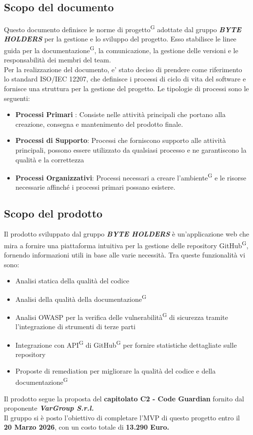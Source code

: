 \documentclass[a4paper, 11pt]{article}
\begin{document}
\subsection{Scopo del documento}
Questo documento definisce le norme di progetto\textsuperscript{G} adottate dal gruppo \textbf{\textit{BYTE HOLDERS}} per la gestione e lo sviluppo del progetto. Esso stabilisce le linee guida per la documentazione\textsuperscript{G}, la comunicazione, la gestione delle versioni e le responsabilità dei membri del team.
\\
Per la realizzazione del documento, e' stato deciso di prendere come riferimento lo standard ISO/IEC 12207, 
che definisce i processi di ciclo di vita del software e fornisce una struttura per la gestione del progetto.
Le tipologie di processi sono le seguenti:
\\
\begin{itemize}
    \item \textbf{Processi Primari} : Consiste nelle attività principali che portano alla creazione, consegna e mantenimento del prodotto finale.
    \item \textbf{Processi di Supporto}: Processi che forniscono supporto alle attività principali, possono essere utilizzato da qualsiasi processo e ne garantiscono la qualità e la correttezza
    \item \textbf{Processi Organizzativi}: Processi necessari a creare l'ambiente\textsuperscript{G} e le risorse necessarie affinché i processi primari possano esistere.
\end{itemize}


\subsection{Scopo del prodotto}
Il prodotto sviluppato dal gruppo \textbf{\textit{BYTE HOLDERS}} è un'applicazione web che mira a fornire una piattaforma intuitiva per la gestione delle repository GitHub\textsuperscript{G}, 
fornendo informazioni utili in base alle varie necessità.
Tra queste funzionalità vi sono:
\begin{itemize}
    \item Analisi statica della qualità del codice
    \item Analisi della qualità della documentazione\textsuperscript{G}
    \item Analisi OWASP per la verifica delle vulnerabilità\textsuperscript{G} di sicurezza tramite l'integrazione di strumenti di terze parti
    \item Integrazione con API\textsuperscript{G} di GitHub\textsuperscript{G} per fornire statistiche dettagliate sulle repository
    \item Proposte di remediation per migliorare la qualità del codice e della documentazione\textsuperscript{G}
\end{itemize}
Il prodotto segue la proposta del \textbf{capitolato C2 - Code Guardian} fornito dal proponente \textbf{\textit{VarGroup S.r.l.}}
\\
Il gruppo si è posto l'obiettivo di completare l'MVP di questo progetto entro il \textbf{20 Marzo 2026}, con un costo totale di \textbf{13.290 Euro.}
\end{document}
